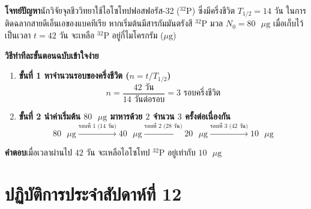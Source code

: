 \begin{worked}
\textbf{โจทย์ปัญหา}\quad นักวิจัยจุลชีววิทยาใช้ไอโซโทปฟอสฟอรัส-32 ($^{32}\text{P}$) ซึ่งมีครึ่งชีวิต $T_{1/2} = 14\text{ วัน}$ ในการติดฉลากสายดีเอ็นเอของแบคทีเรีย หากเริ่มต้นมีสารกัมมันตรังสี $^{32}\text{P}$ มวล $N_0 = 80\text{ }\mu\text{g}$ เมื่อเก็บไว้เป็นเวลา $t = 42\text{ วัน}$ จะเหลือ $^{32}\text{P}$ อยู่กี่ไมโครกรัม ($\mu\text{g}$)

\textbf{วิธีทำทีละขั้นตอนฉบับเข้าใจง่าย}
\begin{enumerate}
    \item \textbf{ขั้นที่ 1 หาจำนวนรอบของครึ่งชีวิต ($n = t / T_{1/2}$)}
    \[
        n = \frac{42\text{ วัน}}{14\text{ วันต่อรอบ}} = 3\text{ รอบครึ่งชีวิต}
    \]
    \item \textbf{ขั้นที่ 2 นำค่าเริ่มต้น $80\text{ }\mu\text{g}$ มาหารด้วย $2$ จำนวน $3$ ครั้งต่อเนื่องกัน}
    \[
        80\text{ }\mu\text{g} \xrightarrow{\text{รอบที่ 1 (14 วัน)}} 40\text{ }\mu\text{g} \xrightarrow{\text{รอบที่ 2 (28 วัน)}} 20\text{ }\mu\text{g} \xrightarrow{\text{รอบที่ 3 (42 วัน)}} 10\text{ }\mu\text{g}
    \]
\end{enumerate}
\textbf{คำตอบ}\quad เมื่อเวลาผ่านไป $42\text{ วัน}$ จะเหลือไอโซโทป $^{32}\text{P}$ อยู่เท่ากับ $10\text{ }\mu\text{g}$
\end{worked}

\section{ปฏิบัติการประจำสัปดาห์ที่ 12}


